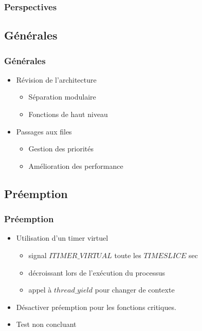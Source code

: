 \documentclass{beamer}
\begin{document}
\begin{frame}
  \frametitle{Perspectives}
\end{frame}

\subsection{Générales}

\begin{frame}
	\frametitle{Générales}
	
	\begin{itemize}
		\item Révision de l'architecture
		\begin{itemize}
			\item Séparation modulaire
			\item Fonctions de haut niveau
		\end{itemize}
		\item Passages aux files
		\begin{itemize}
			\item Gestion des priorités
			\item Amélioration des performance
		\end{itemize}
	
	\end{itemize}
\end{frame}

\subsection{Préemption}

\begin{frame}
  \frametitle{Préemption}
  \begin{itemize}
    \item Utilisation d'un timer virtuel
      \begin{itemize}
      \item signal $ITIMER\_VIRTUAL$ toute les $TIMESLICE$ sec
      \item décroissant lors de l'exécution du processus
      \item appel à $thread\_yield$ pour changer de contexte
      \end{itemize}
    \item Désactiver préemption pour les fonctions critiques.
    \item Test non concluant
  \end{itemize}
\end{frame}
\end{document}
